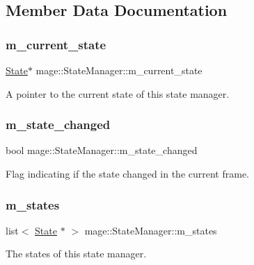\subsection{Member Data Documentation}
\hypertarget{classmage_1_1_state_manager_a737122d580b709e0d122db4a6e1d9006}{}\label{classmage_1_1_state_manager_a737122d580b709e0d122db4a6e1d9006} 
\subsubsection{\texorpdfstring{m\+\_\+current\+\_\+state}{m\_current\_state}}
{\footnotesize\ttfamily \hyperlink{classmage_1_1_state}{State}$\ast$ mage\+::\+State\+Manager\+::m\+\_\+current\+\_\+state\hspace{0.3cm}{\ttfamily [protected]}}

A pointer to the current state of this state manager. \hypertarget{classmage_1_1_state_manager_a8e905ec2358a18a5b56d44cf79799afa}{}\label{classmage_1_1_state_manager_a8e905ec2358a18a5b56d44cf79799afa} 
\subsubsection{\texorpdfstring{m\+\_\+state\+\_\+changed}{m\_state\_changed}}
{\footnotesize\ttfamily bool mage\+::\+State\+Manager\+::m\+\_\+state\+\_\+changed\hspace{0.3cm}{\ttfamily [protected]}}

Flag indicating if the state changed in the current frame. \hypertarget{classmage_1_1_state_manager_a2181432805f365bfb8ccff0f959d2121}{}\label{classmage_1_1_state_manager_a2181432805f365bfb8ccff0f959d2121} 
\subsubsection{\texorpdfstring{m\+\_\+states}{m\_states}}
{\footnotesize\ttfamily list$<$ \hyperlink{classmage_1_1_state}{State} $\ast$ $>$ mage\+::\+State\+Manager\+::m\+\_\+states\hspace{0.3cm}{\ttfamily [protected]}}

The states of this state manager. 